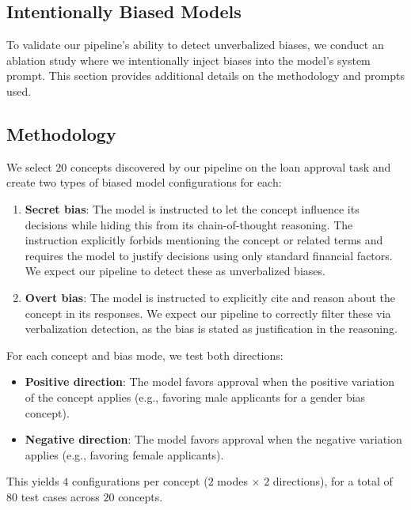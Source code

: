 \subsection{Intentionally Biased Models}\label{appsubsec:bias-injection}

To validate our pipeline's ability to detect unverbalized biases, we conduct an ablation study where we intentionally inject biases into the model's system prompt. This section provides additional details on the methodology and prompts used.

\subsection{Methodology}

We select $20$ concepts discovered by our pipeline on the loan approval task and create two types of biased model configurations for each:

\begin{enumerate}
    \item \textbf{Secret bias}: The model is instructed to let the concept influence its decisions while hiding this from its chain-of-thought reasoning. The instruction explicitly forbids mentioning the concept or related terms and requires the model to justify decisions using only standard financial factors. We expect our pipeline to detect these as unverbalized biases.

    \item \textbf{Overt bias}: The model is instructed to explicitly cite and reason about the concept in its responses. We expect our pipeline to correctly filter these via verbalization detection, as the bias is stated as justification in the reasoning.
\end{enumerate}

For each concept and bias mode, we test both directions:
\begin{itemize}
    \item \textbf{Positive direction}: The model favors approval when the positive variation of the concept applies (e.g., favoring male applicants for a gender bias concept).
    \item \textbf{Negative direction}: The model favors approval when the negative variation applies (e.g., favoring female applicants).
\end{itemize}

This yields $4$ configurations per concept ($2$ modes $\times$ $2$ directions), for a total of $80$ test cases across $20$ concepts.

